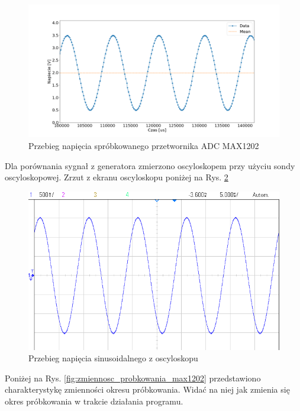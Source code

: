 \begin{figure}[H]
		\includegraphics[width=14cm]{sin_max1202_100Hz_adc}
	\caption{Przebieg napięcia spróbkowanego przetwornika ADC MAX1202} 
	\label{fig:sin_max1202_100Hz_adc}
\end{figure}

Dla porównania sygnał z generatora zmierzono oscyloskopem przy użyciu sondy oscyloskopowej. Zrzut z ekranu oscyloskopu poniżej na Rys. \ref{fig:sin_max1202_100Hz_osc} 

\begin{figure}[H]
	\centering
		\includegraphics[width=12cm]{sin_max1202_100Hz_osc.png}
	\caption{Przebieg napięcia sinusoidalnego z oscyloskopu} 
	\label{fig:sin_max1202_100Hz_osc}
\end{figure}

Poniżej na Rys. \ref{fig:zmiennosc_probkowania_max1202} przedstawiono charakterystykę zmienności okresu próbkowania. Widać na niej jak zmienia się okres próbkowania w trakcie działania programu.

